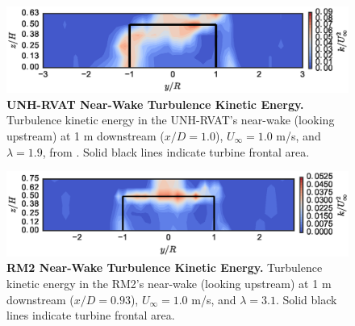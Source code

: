 \documentclass[10pt,letterpaper]{article}
\begin{document}
\begin{figure}
    \includegraphics[width=\textwidth]{figures/RVAT-Re-dep-k_contours_10.eps}

    \caption{{\bf UNH-RVAT Near-Wake Turbulence Kinetic Energy.} Turbulence
        kinetic energy in the UNH-RVAT's near-wake (looking upstream) at 1 m
        downstream ($x/D=1.0$), $U_\infty=1.0$ m/s, and $\lambda=1.9$, from
        \cite{Bachant2016-Energies}. Solid black lines indicate turbine frontal
        area.}

    \label{fig:rvat-kcont}
\end{figure}

\begin{figure}
    \includegraphics[width=\textwidth]{figures/k_contours.eps}

    \caption{{\bf RM2 Near-Wake Turbulence Kinetic Energy.} Turbulence kinetic
        energy in the RM2's near-wake (looking upstream) at 1 m downstream
        ($x/D=0.93$), $U_\infty=1.0$ m/s, and $\lambda=3.1$. Solid black lines
        indicate turbine frontal area.}

    \label{fig:kcont}
\end{figure}
\end{document}

